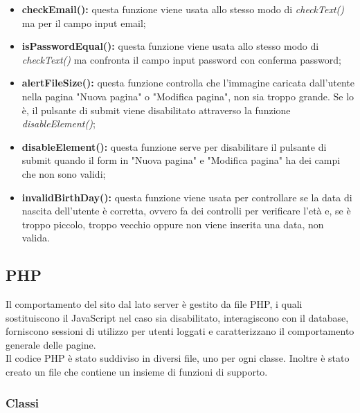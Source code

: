 \begin{itemize}
	\item \textbf{checkEmail():} questa funzione viene usata allo stesso modo di \textit{checkText()} ma per il campo input email;
	\item \textbf{isPasswordEqual():} questa funzione viene usata allo stesso modo di \textit{checkText()} ma confronta il campo input password con conferma password;
	\item \textbf{alertFileSize():} questa funzione controlla che l'immagine caricata dall'utente nella pagina "Nuova pagina" o "Modifica pagina", non sia troppo grande. Se lo è, il pulsante di submit viene disabilitato attraverso la funzione \textit{disableElement()};
	\item \textbf{disableElement():} questa funzione serve per disabilitare il pulsante di submit quando il form in "Nuova pagina" e "Modifica pagina" ha dei campi che non sono validi;
	\item \textbf{invalidBirthDay():} questa funzione viene usata per controllare se la data di nascita dell'utente è corretta, ovvero fa dei controlli per verificare l'età e, se è troppo piccolo, troppo vecchio oppure non viene inserita una data, non valida.
\end{itemize}
\pagebreak
\subsection{PHP}
Il comportamento del sito dal lato server è gestito da file PHP, i quali sostituiscono il JavaScript nel caso sia disabilitato, interagiscono con il database, forniscono sessioni di utilizzo per utenti loggati e caratterizzano il comportamento generale delle pagine.\\
Il codice PHP è stato suddiviso in diversi file, uno per ogni classe. Inoltre è stato creato un file che contiene un insieme di funzioni di supporto.

\subsubsection{Classi}
